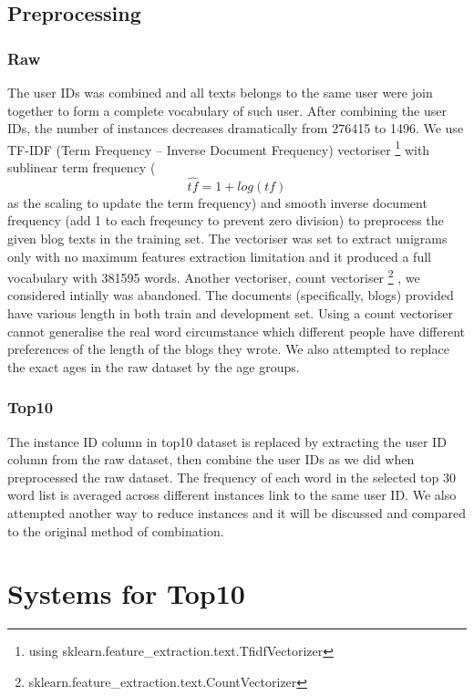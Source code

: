 \documentclass[10pt]{article}
\begin{document}
\subsection{Preprocessing}

\subsubsection{Raw}
\justify

The user IDs was combined and all texts belongs to the same user were join together to form a complete vocabulary of such user. After combining the user IDs, the number of instances decreases dramatically from 276415 to 1496. We use TF-IDF (Term Frequency – Inverse Document Frequency) vectoriser
\footnote{using sklearn.feature\_extraction.text.TfidfVectorizer}
with sublinear term frequency (\begin{equation}\hat{tf}=1+log(tf)\end{equation}
as the scaling to update the term frequency) and smooth inverse document frequency (add 1 to each freqeuncy to prevent zero division) to preprocess the given blog texts in the training set. The vectoriser was set to extract unigrams only with no maximum features extraction limitation and it produced a full vocabulary with 381595 words. Another vectoriser, count vectoriser
\footnote{sklearn.feature\_extraction.text.CountVectorizer}
, we considered intially was abandoned. The documents (specifically, blogs) provided have various length in both train and development set. Using a count vectoriser cannot generalise the real word circumstance which different people have different preferences of the length of the blogs they wrote. We also attempted to replace the exact ages in the raw dataset by the age groups.

\subsubsection{Top10}
\justify

The instance ID column in top10 dataset is replaced by extracting the user ID column from the raw dataset, then combine the user IDs as we did when preprocessed the raw dataset. The frequency of each word in the selected top 30 word list is averaged across different instances link to the same user ID. We also attempted another way to reduce instances and it will be discussed and compared to the original method of combination.

\section{Systems for Top10}
\justify
\end{document}
